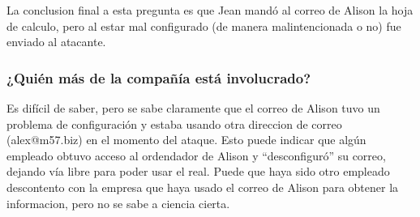\documentclass{article}
\begin{document}
La conclusion final a esta pregunta es que Jean mandó al correo de Alison la hoja de calculo, pero al estar mal configurado (de manera malintencionada o no) fue enviado al atacante.


\subsubsection*{¿Quién más de la compañía está involucrado?}

Es difícil de saber, pero se sabe claramente que el correo de Alison tuvo un problema de configuración y estaba usando otra direccion de correo (alex@m57.biz) en el momento del ataque. Esto puede indicar que algún empleado obtuvo acceso al ordendador de Alison y ``desconfiguró'' su correo, dejando vía libre para poder usar el real. Puede que haya sido otro empleado descontento con la empresa que haya usado el correo de Alison para obtener la informacion, pero no se sabe a ciencia cierta.
\end{document}
